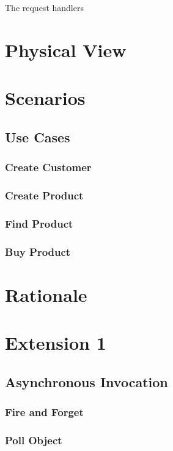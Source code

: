 \documentclass[a4paper]{article}
\begin{document}
The request handlers 

\section{Physical View}

\section{Scenarios}

\subsection{Use Cases}

\subsubsection{Create Customer}

\subsubsection{Create Product}

\subsubsection{Find Product}

\subsubsection{Buy Product}

\section{Rationale}

\section{Extension 1}

\subsection{Asynchronous Invocation}
\subsubsection{Fire and Forget}
\subsubsection{Poll Object}
\end{document}
